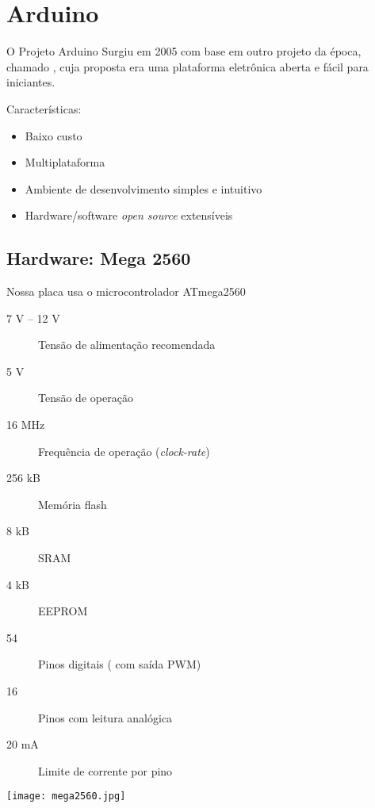 \section{Arduino}


\begin{frame}{O Projeto Arduino}
	Surgiu em 2005 com base em outro projeto da época, chamado , cuja proposta era uma plataforma eletrônica aberta e fácil para iniciantes.

	\medskip
	Características:
	\begin{itemize}
		\item Baixo custo
		\item Multiplataforma
		\item Ambiente de desenvolvimento simples e intuitivo
		\item Hardware/software \textit{open source} extensíveis
	\end{itemize}
\end{frame}


\subsection{Hardware: Mega 2560}


\begin{frame}{\insertsubsection}
	Nossa placa usa o microcontrolador \textcolor{CustomTeal}{ATmega2560}
	\begin{description}
		\item[7 V -- 12 V] Tensão de alimentação recomendada
		\item[5 V] Tensão de operação
		\item[16 MHz] Frequência de operação (\textit{clock-rate})
		\item[256 kB] Memória flash
		\item[8 kB] SRAM
		\item[4 kB] EEPROM
		\item[54] Pinos digitais ( com saída PWM)
		\item[16] Pinos com leitura analógica
		\item[20 mA] Limite de corrente por pino
	\end{description}
\end{frame}


{ 
\begin{frame}{\insertsubsection}
	\texttt{[image: mega2560.jpg]}
\end{frame}
}


